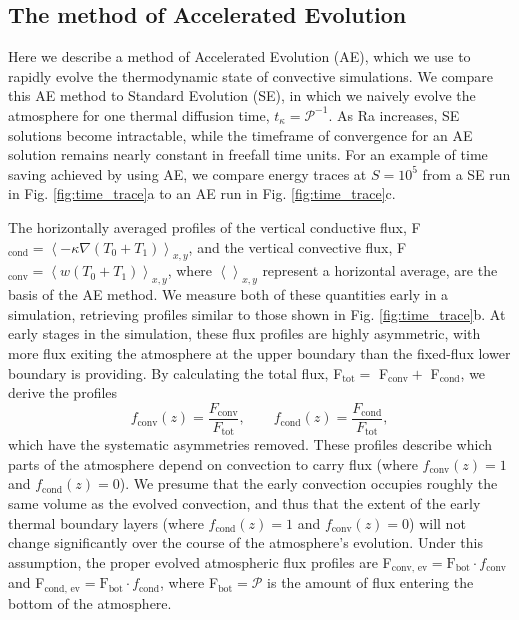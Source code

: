 \documentclass[aps, pre, onecolumn, nofootinbib, notitlepage, groupedaddress, amsfonts, amssymb, amsmath, longbibliography]{revtex4-1}
\newcommand{\angles}[1]{\ensuremath{\left\langle #1 \right\rangle}}
\newcommand{\grad}{\ensuremath{\nabla}}
\begin{document}
\subsection{The method of Accelerated Evolution}
\label{subsection:ae}
Here we describe a method of Accelerated Evolution (AE), which we use 
to rapidly evolve the thermodynamic state of convective simulations.  
We compare this AE method to Standard Evolution
(SE), in which we naively evolve the atmosphere for one thermal diffusion time,
$t_\kappa = \mathcal{P}^{-1}$. As Ra increases, SE solutions become intractable, 
while the timeframe of convergence for an AE solution remains nearly constant
in freefall time units.
For an example of time saving achieved by using AE, we compare
energy traces at $S = 10^5$ from a SE run in Fig. \ref{fig:time_trace}a to an AE run
in Fig. \ref{fig:time_trace}c.

The horizontally averaged profiles of the vertical conductive flux, 
F$_{\text{cond}} = \angles{-\kappa\grad(T_0 + T_1)}_{x,y}$, and the vertical convective flux,
F$_{\text{conv}} = \angles{w(T_0 + T_1)}_{x,y}$, where $\angles{}_{x,y}$ represent
a horizontal average, are the basis of the AE method. We measure
both of these quantities early in a simulation, retrieving profiles similar to
those shown in Fig. \ref{fig:time_trace}b.
At early stages in the simulation, these flux profiles are highly asymmetric,
with more flux exiting the atmosphere at the upper boundary than 
the fixed-flux lower boundary is providing.
By calculating the total flux,
F$_{\text{tot}} =$ F$_{\text{conv}} +$ F$_{\text{cond}}$, we derive the profiles
\begin{equation}
f_{\text{conv}}(z) = \frac{F_{\text{conv}}}{F_{\text{tot}}},\qquad
f_{\text{cond}}(z) = \frac{F_{\text{cond}}}{F_{\text{tot}}},
\label{eqn:bvp_ratios}
\end{equation}
which have the systematic asymmetries removed. These profiles describe which
parts of the atmosphere depend on convection to carry flux (where $f_{\text{conv}}(z) = 1$
and $f_{\text{cond}}(z) = 0$).
We presume that the early convection occupies roughly the same volume as the evolved
convection, and thus that the extent of the early thermal boundary layers 
(where $f_{\text{cond}}(z) = 1$ and $f_{\text{conv}}(z) = 0$) 
will not change significantly over the course of the atmosphere's evolution.
Under this assumption, the proper evolved atmospheric flux profiles
are F$_{\text{conv, ev}} = \text{F}_{\text{bot}}\cdot f_{\text{conv}}$
and F$_{\text{cond, ev}} = \text{F}_{\text{bot}}\cdot f_{\text{cond}}$,
where F$_{\text{bot}} = \mathcal{P}$ is the amount of flux entering the
bottom of the atmosphere.
\end{document}
